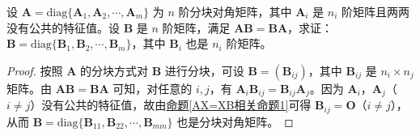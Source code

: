 \documentclass[../../main.tex]{subfiles}
\begin{document}
\begin{example}
设 \(\boldsymbol{A} = \mathrm{diag}\{\boldsymbol{A}_1,\boldsymbol{A}_2,\cdots,\boldsymbol{A}_m\}\) 为 \(n\) 阶分块对角矩阵，其中 \(\boldsymbol{A}_i\) 是 \(n_i\) 阶矩阵且两两没有公共的特征值。设 \(\boldsymbol{B}\) 是 \(n\) 阶矩阵，满足 \(\boldsymbol{AB = BA}\)，求证：\(\boldsymbol{B} = \mathrm{diag}\{\boldsymbol{B}_1,\boldsymbol{B}_2,\cdots,\boldsymbol{B}_m\}\)，其中 \(\boldsymbol{B}_i\) 也是 \(n_i\) 阶矩阵。
\end{example}
\begin{proof}
按照 \(\boldsymbol{A}\) 的分块方式对 \(\boldsymbol{B}\) 进行分块，可设 \(\boldsymbol{B} = (\boldsymbol{B}_{ij})\)，其中 \(\boldsymbol{B}_{ij}\) 是 \(n_i\times n_j\) 矩阵。由 \(\boldsymbol{AB = BA}\) 可知，对任意的 \(i,j\)，有 \(\boldsymbol{A}_i\boldsymbol{B}_{ij} = \boldsymbol{B}_{ij}\boldsymbol{A}_j\)。因为 \(\boldsymbol{A}_i\)，\(\boldsymbol{A}_j\)（\(i\neq j\)）没有公共的特征值，故由\hyperref[AX=XB相关命题1]{命题\ref{AX=XB相关命题1}}可得 \(\boldsymbol{B}_{ij} = \boldsymbol{O}\)（\(i\neq j\)），从而 \(\boldsymbol{B} = \mathrm{diag}\{\boldsymbol{B}_{11},\boldsymbol{B}_{22},\cdots,\boldsymbol{B}_{mm}\}\) 也是分块对角矩阵。
\end{proof}
\end{document}
